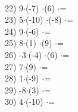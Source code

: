 \documentclass[a4paper,10pt]{article}
\begin{document}
\vspace{0.5cm}\\22)   9$\cdot$(-7) $\cdot$(6) $\cdot$=
\vspace{0.5cm}\\23)   5$\cdot$(-10) $\cdot$(-8) $\cdot$=
\vspace{0.5cm}\\24)   9$\cdot$(-6) $\cdot$=
\vspace{0.5cm}\\25)   8$\cdot$(1) $\cdot$(9) $\cdot$=
\vspace{0.5cm}\\26)   -3$\cdot$(-4) $\cdot$(6) $\cdot$=
\vspace{0.5cm}\\27)   7$\cdot$(9) $\cdot$=
\vspace{0.5cm}\\28)   1$\cdot$(-9) $\cdot$=
\vspace{0.5cm}\\29)   -8$\cdot$(3) $\cdot$=
\vspace{0.5cm}\\30)   4$\cdot$(-10) $\cdot$=
\vspace{0.5cm}\\\pagebreak
\end{document}
